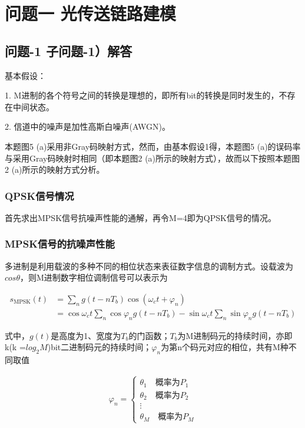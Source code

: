 \documentclass[bwprint]{gmcmthesis}
\numberwithin{equation}{section}
\begin{document}
\section{问题一 光传送链路建模}

\subsection{问题-1 子问题-1）解答}
基本假设：

1. M进制的各个符号之间的转换是理想的，即所有bit的转换是同时发生的，不存在中间状态。

2. 信道中的噪声是加性高斯白噪声(AWGN)。

本题图5 (a)采用非Gray码映射方式，然而，由基本假设1得，本题图5 (a)的误码率与采用Gray码映射时相同（即本题图2 (a)所示的映射方式），故而以下按照本题图2 (a)所示的映射方式分析。

\subsubsection{QPSK信号情况}
首先求出MPSK信号抗噪声性能的通解，再令M=4即为QPSK信号的情况。


\subsubsection*{MPSK信号的抗噪声性能}
多进制是利用载波的多种不同的相位状态来表征数字信息的调制方式。设载波为$cos\theta$，则M进制数字相位调制信号可以表示为

\begin{equation}
\begin{aligned}
s_{\mathrm{MPSK}}(t)&=\sum_{n} g\left(t-n T_{b}\right) \cos \left(\omega_{c} t+\varphi_{n}\right) \\ &=\cos \omega_{c} t \sum_{n} \cos \varphi_{n} g\left(t-n T_{b}\right)-\sin \omega_{c} t \sum_{n} \sin \varphi_{n} g\left(t-n T_{b}\right)
\end{aligned}
\end{equation}


式中，$g(t)$是高度为1、宽度为$T_{b}$的门函数；$T_{b}$为M进制码元的持续时间，亦即k(k =$ log_{2}M$)bit二进制码元的持续时间；$\varphi_{n}$为第n个码元对应的相位，共有M种不同取值

\begin{equation}
\begin{aligned}
\varphi_{n}=\left\{\begin{array}{l}{\theta_{1}}\quad \mbox{概率为}P_{1}\\ {\theta_{2}} \quad \mbox{概率为}P_{2}\\ {\vdots} \\ {\theta_{M}}\quad \mbox{概率为}P_{M}\end{array}\right.
\end{aligned}
\end{equation}
\end{document}

